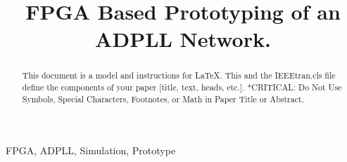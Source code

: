 \documentclass[conference]{IEEEtran}
\begin{document}
\title{FPGA Based Prototyping of an ADPLL Network.\\}

\author{
}

\maketitle

\begin{abstract}
    This document is a model and instructions for \LaTeX.
    This and the IEEEtran.cls file define the components of your paper [title, text, heads, etc.]. *CRITICAL: Do Not Use Symbols, Special Characters, Footnotes, 
    or Math in Paper Title or Abstract.
\end{abstract}

\begin{IEEEkeywords}
    FPGA, ADPLL, Simulation, Prototype
\end{IEEEkeywords}
\end{document}
